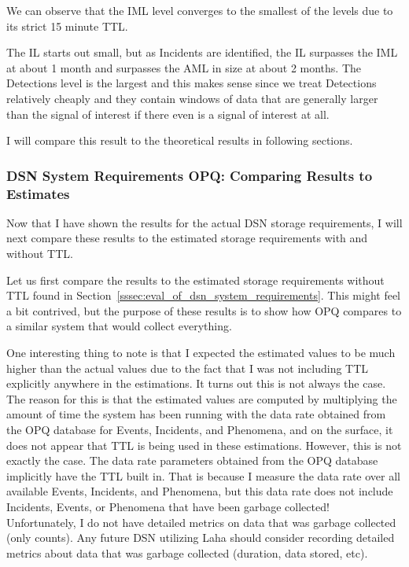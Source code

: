 We can observe that the IML level converges to the smallest of the levels due to its strict 15 minute TTL.

The IL starts out small, but as Incidents are identified, the IL surpasses the IML at about 1 month and surpasses the AML in size at about 2 months. The Detections level is the largest and this makes sense since we treat Detections relatively cheaply and they contain windows of data that are generally larger than the signal of interest if there even is a signal of interest at all.

I will compare this result to the theoretical results in following sections.

\subsubsection{DSN System Requirements OPQ: Comparing Results to Estimates}

Now that I have shown the results for the actual DSN storage requirements, I will next compare these results to the estimated storage requirements with and without TTL\@.

Let us first compare the results to the estimated storage requirements without TTL found in Section~\ref{sssec:eval_of_dsn_system_requirements}. This might feel a bit contrived, but the purpose of these results is to show how OPQ compares to a similar system that would collect everything.

One interesting thing to note is that I expected the estimated values to be much higher than the actual values due to the fact that I was not including TTL explicitly anywhere in the estimations. It turns out this is not always the case. The reason for this is that the estimated values are computed by multiplying the amount of time the system has been running with the data rate obtained from the OPQ database for Events, Incidents, and Phenomena, and on the surface, it does not appear that TTL is being used in these estimations. However, this is not exactly the case. The data rate parameters obtained from the OPQ database implicitly have the TTL built in. That is because I measure the data rate over all available Events, Incidents, and Phenomena, but this data rate does not include Incidents, Events, or Phenomena that have been garbage collected! Unfortunately, I do not have detailed metrics on data that was garbage collected (only counts). Any future DSN utilizing Laha should consider recording detailed metrics about data that was garbage collected (duration, data stored, etc).

